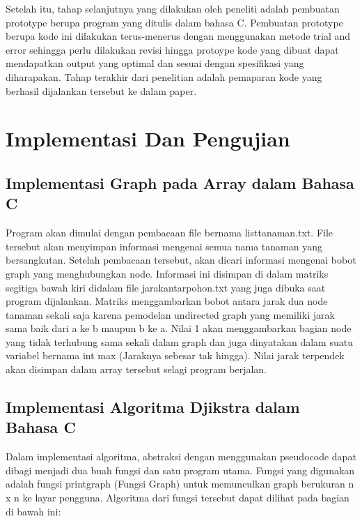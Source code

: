 \documentclass[conference]{IEEEtran}
\begin{document}
Setelah itu, tahap selanjutnya yang dilakukan oleh peneliti
adalah pembuatan prototype berupa program yang ditulis
dalam bahasa C. Pembuatan prototype berupa kode ini dilakukan
terus-menerus dengan menggunakan metode trial and
error sehingga perlu dilakukan revisi hingga protoype kode
yang dibuat dapat mendapatkan output yang optimal dan
sesuai dengan spesifikasi yang diharapakan. Tahap terakhir
dari penelitian adalah pemaparan kode yang berhasil dijalankan
tersebut ke dalam paper.

\begin{center}
\end{center}

\section{Implementasi Dan Pengujian}

\subsection{Implementasi Graph pada Array dalam Bahasa C}
Program akan dimulai dengan pembacaan file bernama
listtanaman.txt. File tersebut akan menyimpan informasi mengenai
semua nama tanaman yang bersangkutan. Setelah pembacaan
tersebut, akan dicari informasi mengenai bobot graph
yang menghubungkan node. Informasi ini disimpan di dalam
matriks segitiga bawah kiri didalam file jarakantarpohon.txt
yang juga dibuka saat program dijalankan. Matriks menggambarkan
bobot antara jarak dua node tanaman sekali saja karena
pemodelan undirected graph yang memiliki jarak sama baik
dari a ke b maupun b ke a. Nilai 1 akan menggambarkan
bagian node yang tidak terhubung sama sekali dalam graph
dan juga dinyatakan dalam suatu variabel bernama int max
(Jaraknya sebesar tak hingga). Nilai jarak terpendek akan
disimpan dalam array tersebut selagi program berjalan.

\subsection{Implementasi Algoritma Djikstra dalam Bahasa C}
Dalam implementasi algoritma, abstraksi dengan menggunakan
pseudocode dapat dibagi menjadi dua buah fungsi dan
satu program utama. Fungsi yang digunakan adalah fungsi
printgraph (Fungsi Graph) untuk memunculkan graph berukuran
n x n ke layar pengguna. Algoritma dari fungsi tersebut
dapat dilihat pada bagian di bawah ini:
\end{document}
